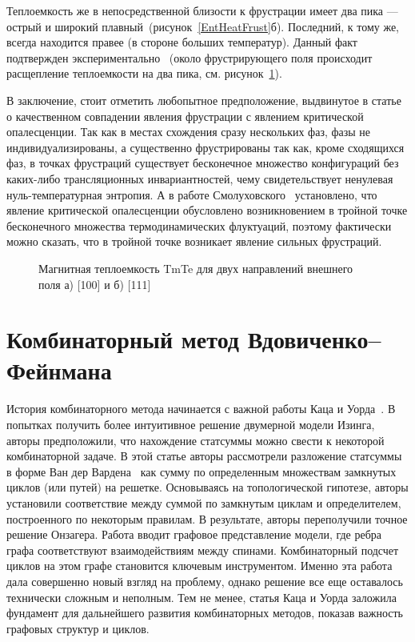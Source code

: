 Теплоемкость же в непосредственной близости к фрустрации имеет два пика --- острый и широкий плавный~(рисунок~\ref{EntHeatFrust}б). Последний, к тому же, всегда находится правее (в стороне больших температур). Данный факт подтвержден экспериментально~\cite{matsumura1997} (около фрустрирующего поля происходит расщепление теплоемкости на два пика, см. рисунок~\ref{new1}). 

В заключение, стоит отметить любопытное предположение, выдвинутое в  статье~\cite{vakbib1} о качественном совпадении явления фрустрации с явлением критической опалесценции. Так как в местах схождения сразу нескольких фаз, фазы не индивидуализированы, а существенно фрустрированы так как, кроме сходящихся фаз, в точках фрустраций существует бесконечное множество конфигураций без каких-либо трансляционных инвариантностей, чему свидетельствует ненулевая нуль-температурная энтропия. А в работе Смолуховского~\cite{smoluchowski1907} установлено, что явление критической опалесценции обусловлено возникновением в тройной точке бесконечного множества термодинамических флуктуаций, поэтому фактически можно сказать, что в тройной точке возникает явление сильных фрустраций.

 \begin{figure}[h]
 	\caption{Магнитная теплоемкость TmTe для двух направлений внешнего поля а) [100] и б) [111]~\cite{matsumura1997}}
 	\label{new1}
 \end{figure}

\section{Комбинаторный метод Вдовиченко--Фейнмана}\label{sec:markup}

История комбинаторного метода начинается с важной работы Каца и Уорда~\cite{kac1952}. В попытках получить более интуитивное решение двумерной модели Изинга, авторы предположили, что нахождение статсуммы можно свести к некоторой комбинаторной задаче. В этой статье авторы рассмотрели разложение статсуммы в форме Ван дер Вардена~\cite{warden1941} как сумму по определенным множествам замкнутых циклов (или путей) на решетке. Основываясь на топологической гипотезе, авторы установили соответствие между суммой по замкнутым циклам и определителем, построенного по некоторым правилам. В результате, авторы переполучили точное решение Онзагера. Работа вводит графовое представление модели, где ребра графа соответствуют взаимодействиям между спинами. Комбинаторный подсчет циклов на этом графе становится ключевым инструментом. Именно эта работа дала совершенно новый взгляд на проблему, однако решение все еще оставалось технически сложным и неполным. Тем не менее, статья Каца и Уорда заложила фундамент для дальнейшего развития комбинаторных методов, показав важность графовых структур и циклов. 

